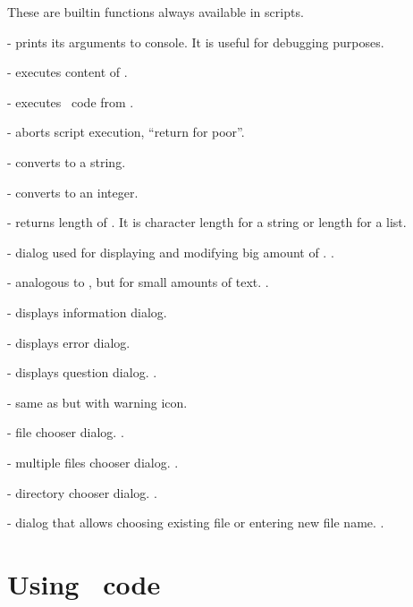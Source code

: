 These are builtin functions always available in scripts.

 - prints its arguments to console. It is
useful for debugging purposes.

 - executes content of .

 - executes \python\ code from .

 - aborts script execution, ``return for poor''.

 - converts  to a string.

 - converts  to an integer.

 - returns length of . It is character length
for a string or length for a list.

 - dialog used for displaying 
and modifying big amount of . .

 - 
analogous to , but for small amounts of text. 
.

 - displays information dialog.

 - displays error dialog.

 - displays question dialog. .

 - same as  but with warning icon.

 - file chooser dialog.
.

 - multiple files chooser dialog.
.

 - directory chooser dialog.
.

 - dialog that allows 
choosing existing file or entering new file name.
.


\section{Using \python\ code}

